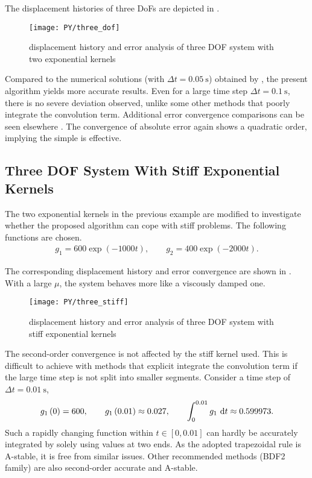 The displacement histories of three DoFs are depicted in .
\begin{figure}[H]
\centering
\texttt{[image: PY/three\_dof]}
\caption{displacement history and error analysis of three DOF system with two exponential kernels}\label{fig:three}
\end{figure}

Compared to the numerical solutions (with $\Delta{}t=\SI{0.05}{\second}$) obtained by \citet{Cortes2009}, the present algorithm yields more accurate results. Even for a large time step $\Delta{}t=\SI{0.1}{\second}$, there is no severe deviation observed, unlike some other methods \citep{Puthanpurayil2014,Liu2014} that poorly integrate the convolution term. Additional error convergence comparisons can be seen elsewhere \citep{Liu2023}. The convergence of absolute error again shows a quadratic order, implying the simple  is effective.
\subsection{Three DOF System With Stiff Exponential Kernels}
The two exponential kernels in the previous example are modified to investigate whether the proposed algorithm can cope with stiff problems. The following functions are chosen.
\begin{gather}
g_1=600\exp\left(-1000t\right),\qquad
g_2=400\exp\left(-2000t\right).
\end{gather}

The corresponding displacement history and error convergence are shown in . With a large $\mu$, the system behaves more like a viscously damped one.
\begin{figure}[H]
\centering
\texttt{[image: PY/three\_stiff]}
\caption{displacement history and error analysis of three DOF system with stiff exponential kernels}\label{fig:three_stiff}
\end{figure}
The second-order convergence is not affected by the stiff kernel used. This is difficult to achieve with methods that explicit integrate the convolution term if the large time step is not split into smaller segments. Consider a time step of $\Delta{}t=\SI{0.01}{\second}$,
\begin{gather}
g_1\left(0\right)=600,\qquad
g_1\left(0.01\right)\approx\num{0.027},\qquad\int_{0}^{0.01}g_1~\mathrm{d}t\approx0.599973.
\end{gather}
Such a rapidly changing function within $t\in[0,0.01]$ can hardly be accurately integrated by solely using values at two ends.
As the adopted trapezoidal rule is A-stable, it is free from similar issues. Other recommended methods (BDF2 family) are also second-order accurate and A-stable.
